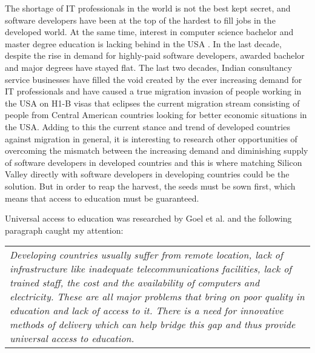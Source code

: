 \documentclass[a4paper, 10pt, conference]{ieeeconf}
\begin{document}
\vspace{3 mm}

The shortage of IT professionals in the world is not the best kept secret, and software developers have been at the top of the hardest to fill jobs in the developed world. At the same time, interest in computer science bachelor and master degree education is lacking behind in the USA \cite{bach2016}. In the last decade, despite the rise in demand for highly-paid software developers, awarded bachelor and major degrees have stayed flat. The last two decades, Indian consultancy service businesses have filled the void created by the ever increasing demand for IT professionals and have caused a true migration invasion of people working in the USA on H1-B visas that eclipses the current migration stream consisting of people from Central American countries looking for better economic situations in the USA. Adding to this the current stance and trend of developed countries against migration in general, it is interesting to research other opportunities of overcoming the mismatch between the increasing demand and diminishing supply of software developers in developed countries and this is where matching Silicon Valley directly with software developers in developing countries could be the solution. But in order to reap the harvest, the seeds must be sown first, which means that access to education must be guaranteed.

\vspace{3 mm}

Universal access to education was researched by Goel et al. \cite{Goel2012} and the following paragraph caught my attention:

\vspace{3 mm}

\begin{tabular}{|p{7.6cm}}
\textit{Developing countries usually suffer from remote location, lack of infrastructure like inadequate telecommunications facilities, lack of trained staff, the cost and the availability of computers and electricity. These are all major problems that bring on poor quality in education and lack of access to it. There is a need for innovative methods of delivery which can help bridge this gap and thus provide universal access to education.}\\
\end{tabular}

\vspace{3 mm}
\end{document}
